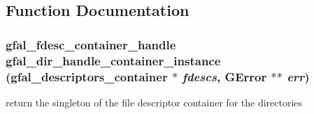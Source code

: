 \subsection{Function Documentation}
\subsubsection{\setlength{\rightskip}{0pt plus 5cm}gfal\_\-fdesc\_\-container\_\-handle gfal\_\-dir\_\-handle\_\-container\_\-instance (gfal\_\-descriptors\_\-container $\ast$ {\em fdescs}, GError $\ast$$\ast$ {\em err})}\label{gfal__common__dir__handle_8c_0973d623e1abd39d0830739b0710512f}


return the singleton of the file descriptor container for the directories 
